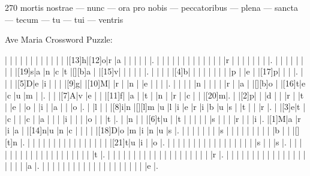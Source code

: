 \documentclass[12pt]{article}
\begin{document}
\pagestyle{fancy}
\fancyhf{}
\renewcommand{\headrulewidth}{0pt}
\renewcommand{\footrulewidth}{0pt}
\libertine
\renewcommand\PuzzleClueFont{\rm\normalsize}
\noindent\begin{rotate}{0}
\small
\end{rotate}
\hfill
\begin{rotate}{270}
\qquad \small mortis nostrae --- nunc --- ora pro nobis --- peccatoribus --- plena --- sancta --- tecum --- tu --- tui --- ventris
\end{rotate}
\begin{center}
  \huge{Ave Maria Crossword Puzzle:}
\end{center}
\vspace{1.5cm}
\begin{Puzzle}{22}{22}
  |{}  |{}  |{}  |{}  |{}  |{}  |{}  |{}  |{}  |{}  |{}  |{}  |[13]h|[12]o|r   |a   |{}  |{}  |{}  |{}  |{}  |.
  |{}  |{}  |{}  |{}  |{}  |{}  |{}  |{}  |{}  |{}  |{}  |{}  |{}  |r   |{}  |{}  |{}  |{}  |{}  |{}  |{}  |.
  |{}  |{}  |{}  |{}  |{}  |{}  |{}  |{}  |[19]s|a   |n   |c   |t   |[][b]a   |{}  |[15]v|{}  |{}  |{}  |{}  |{}  |.
  |{}  |{}  |{}  |{}  |[4]b|{}  |{}  |{}  |{}  |{}  |{}  |{}  |{}  |p   |{}  |e   |{}  |[17]p|{}  |{}  |{}  |.
  |{}  |{}  |{}  |[5]D|e   |i   |{}  |{}  |{}  |[9]g|{}  |[10]M|{}  |r   |{}  |n   |{}  |e   |{}  |{}  |{}  |.
  |{}  |{}  |{}  |{}  |n   |{}  |{}  |{}  |{}  |r   |{}  |a   |{}  |[][b]o   |{}  |[16]t|e   |c   |u   |m   |{}  |.
  |{}  |{}  |[7]A|v   |e   |{}  |{}  |[11]f|{}  |a   |{}  |t   |{}  |n   |{}  |r   |{}  |c   |{}  |{}  |[20]m|.
  |{}  |[2]p|{}  |{}  |d   |{}  |{}  |r   |{}  |t   |{}  |e   |{}  |o   |{}  |i   |{}  |a   |{}  |{}  |o   |.
  |{}  |l   |{}  |{}  |[8]i|n   |[][l]m   |u   |l   |i   |e   |r   |i   |b   |u   |s   |{}  |t   |{}  |{}  |r   |.
  |{}  |[3]e|t   |{}  |c   |{}  |{}  |c   |{}  |a   |{}  |{}  |{}  |i   |{}  |{}  |{}  |o   |{}  |{}  |t   |.
  |{}  |n   |{}  |{}  |[6]t|u   |{}  |t   |{}  |{}  |{}  |{}  |{}  |s   |{}  |{}  |{}  |r   |{}  |{}  |i   |.
  |[1]M|a   |r   |i   |a   |{}  |[14]n|u   |n   |c   |{}  |{}  |{}  |{}  |[18]D|o   |m   |i   |n   |u   |s   |.
  |{}  |{}  |{}  |{}  |{}  |{}  |{}  |s   |{}  |{}  |{}  |{}  |{}  |{}  |{}  |{}  |{}  |b   |{}  |{}  |[][t]n   |.
  |{}  |{}  |{}  |{}  |{}  |{}  |{}  |{}  |{}  |{}  |{}  |{}  |{}  |{}  |{}  |{}  |[21]t|u   |i   |{}  |o   |.
  |{}  |{}  |{}  |{}  |{}  |{}  |{}  |{}  |{}  |{}  |{}  |{}  |{}  |{}  |{}  |{}  |{}  |s   |{}  |{}  |s   |.
  |{}  |{}  |{}  |{}  |{}  |{}  |{}  |{}  |{}  |{}  |{}  |{}  |{}  |{}  |{}  |{}  |{}  |{}  |{}  |{}  |t   |.
  |{}  |{}  |{}  |{}  |{}  |{}  |{}  |{}  |{}  |{}  |{}  |{}  |{}  |{}  |{}  |{}  |{}  |{}  |{}  |{}  |r   |.
  |{}  |{}  |{}  |{}  |{}  |{}  |{}  |{}  |{}  |{}  |{}  |{}  |{}  |{}  |{}  |{}  |{}  |{}  |{}  |{}  |a   |.
  |{}  |{}  |{}  |{}  |{}  |{}  |{}  |{}  |{}  |{}  |{}  |{}  |{}  |{}  |{}  |{}  |{}  |{}  |{}  |{}  |e   |.
\end{Puzzle}
\end{document}

